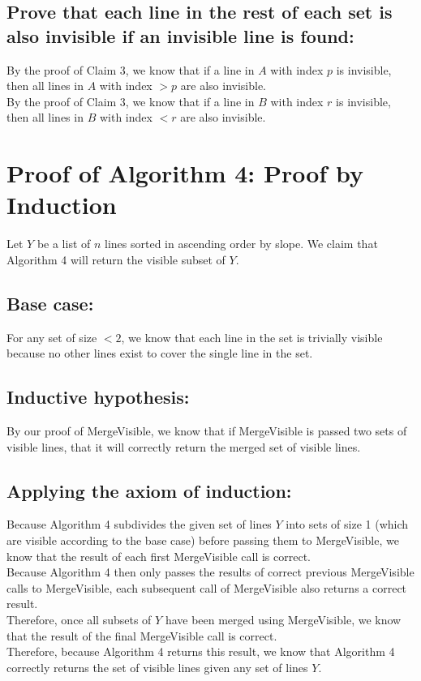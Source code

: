 \documentclass{article}
\begin{document}
\subsection*{Prove that each line in the rest of each set is also invisible if an invisible line is found:}
By the proof of Claim 3, we know that if a line in $A$ with index $p$ is invisible, then all lines in $A$ with index $> p$ are also invisible.\\
By the proof of Claim 3, we know that if a line in $B$ with index $r$ is invisible, then all lines in $B$ with index $< r$ are also invisible.

\section*{Proof of Algorithm 4: Proof by Induction}
    Let $Y$ be a list of $n$ lines sorted in ascending order by slope.  We claim that Algorithm 4 will return the visible subset of $Y$.
    \subsection*{Base case:}
    For any set of size $< 2$, we know that each line in the set is trivially visible because no other lines exist to cover the single line in the set.
    \subsection*{Inductive hypothesis:}
    By our proof of MergeVisible, we know that if MergeVisible is passed two sets of visible lines, that it will correctly return the merged set of visible lines.
    \subsection*{Applying the axiom of induction:}
    Because Algorithm 4 subdivides the given set of lines $Y$ into sets of size 1 (which are visible according to the base case) before passing them to MergeVisible, we know that the result of each first MergeVisible call is correct.\\
    Because Algorithm 4 then only passes the results of correct previous MergeVisible calls to MergeVisible, each subsequent call of MergeVisible also returns a correct result.\\
    Therefore, once all subsets of $Y$ have been merged using MergeVisible, we know that the result of the final MergeVisible call is correct.\\
    Therefore, because Algorithm 4 returns this result, we know that Algorithm 4 correctly returns the set of visible lines given any set of lines $Y$.
\end{document}
